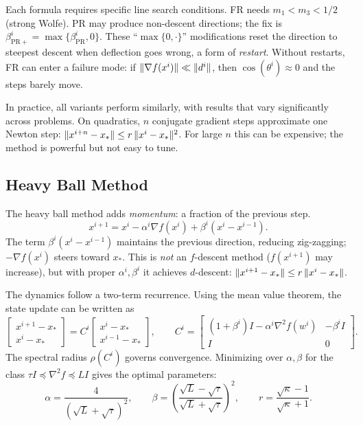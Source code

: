 Each formula requires specific line search conditions.
FR needs $m_1 < m_3 < 1/2$ (strong Wolfe).
PR may produce non-descent directions; the fix is $\beta_{\mathrm{PR}+}^i = \max\{\beta_{\mathrm{PR}}^i, 0\}$.
These ``$\max\{0, \cdot\}$'' modifications reset the direction to steepest descent when deflection goes wrong, a form of \emph{restart}.
Without restarts, FR can enter a failure mode: if $\lVert\nabla f(x^i)\rVert \ll \lVert d^i\rVert$, then $\cos(\theta^i) \approx 0$ and the steps barely move.

In practice, all variants perform similarly, with results that vary significantly across problems.
On quadratics, $n$ conjugate gradient steps approximate one Newton step: $\lVert x^{i+n} - x_*\rVert \leq r\, \lVert x^i - x_*\rVert^2$.
For large $n$ this can be expensive; the method is powerful but not easy to tune.


\subsection{Heavy Ball Method}\label{sec:heavy-ball}

The heavy ball method adds \emph{momentum}: a fraction of the previous step.
\begin{equation}\label{eq:heavy-ball}
	x^{i+1} = x^i - \alpha^i \nabla f(x^i) + \beta^i (x^i - x^{i-1}).
\end{equation}
The term $\beta^i(x^i - x^{i-1})$ maintains the previous direction, reducing zig-zagging; $-\nabla f(x^i)$ steers toward $x_*$.
This is \emph{not} an $f$-descent method ($f(x^{i+1})$ may increase), but with proper $\alpha^i, \beta^i$ it achieves $d$-descent: $\lVert x^{i+1} - x_*\rVert \leq r\, \lVert x^i - x_*\rVert$.

The dynamics follow a two-term recurrence.
Using the mean value theorem, the state update can be written as
\begin{equation}\label{eq:heavy-ball-state}
	\begin{bmatrix} x^{i+1} - x_* \\ x^i - x_* \end{bmatrix}
	= C^i
	\begin{bmatrix} x^i - x_* \\ x^{i-1} - x_* \end{bmatrix},
	\qquad
	C^i = \begin{bmatrix}
		(1 + \beta^i)I - \alpha^i \nabla^2 f(w^i) & -\beta^i I \\
		I & 0
	\end{bmatrix}.
\end{equation}
The spectral radius $\rho(C^i)$ governs convergence.
Minimizing over $\alpha, \beta$ for the class $\tau I \preceq \nabla^2 f \preceq LI$ gives the optimal parameters:
\begin{equation}\label{eq:heavy-ball-optimal}
	\alpha = \frac{4}{(\sqrt{L} + \sqrt{\tau})^2},
	\qquad
	\beta = \left(\frac{\sqrt{L} - \sqrt{\tau}}{\sqrt{L} + \sqrt{\tau}}\right)^{\!2},
	\qquad
	r = \frac{\sqrt{\kappa} - 1}{\sqrt{\kappa} + 1}.
\end{equation}

